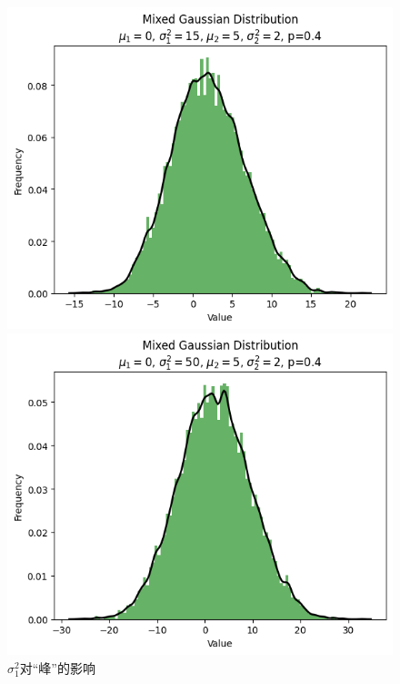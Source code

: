 \documentclass{article}
\begin{document}
\begin{figure}[H]
\begin{minipage}[b]{0.3\linewidth}
        \caption{$\sigma_1^2=5$}
    \end{minipage}
    \hfill
    \begin{minipage}[b]{0.3\linewidth}
        \centering
        \includegraphics[width=\linewidth]{figure/sigma_1^2=15.png}
        \caption{$\sigma_1^2=15$}
    \end{minipage}
    \hfill
    \begin{minipage}[b]{0.3\linewidth}
        \centering
        \includegraphics[width=\linewidth]{figure/sigma_1^2=50.png}
        \caption{$\sigma_1^2=50$}
    \end{minipage}
    \caption{$\sigma_1^2$对“峰”的影响}
    \label{fig:sigma1}
\end{figure}
\end{document}
